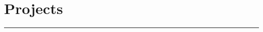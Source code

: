\documentclass[10pt]{article}
\begin{document}
 

\vspace{5pt}
\section*{Projects}
\noindent %
\rule{\textwidth}{0.4pt}
\end{document}
